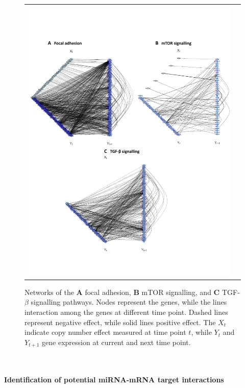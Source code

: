 \begin{figure}[h!]
\centering
\begin{tabular}{cc} 
\includegraphics[scale=0.65]{Figure3.pdf}
\end{tabular}
\caption{Networks of the \textbf{A} focal adhesion, \textbf{B} mTOR signalling, and \textbf{C} TGF-$\beta$ signalling pathways. Nodes represent the genes, while the lines interaction among the genes at different time point. Dashed lines represent negative effect, while solid lines positive effect. The $X_t$ indicate copy number effect measured at time point $t$, while $Y_t$ and $Y_{t+1}$ gene expression at current and next time point.}
\label{fig:figure53}
\end{figure}
\\
\\
\textbf{Identification of potential miRNA-mRNA target interactions}
\\

